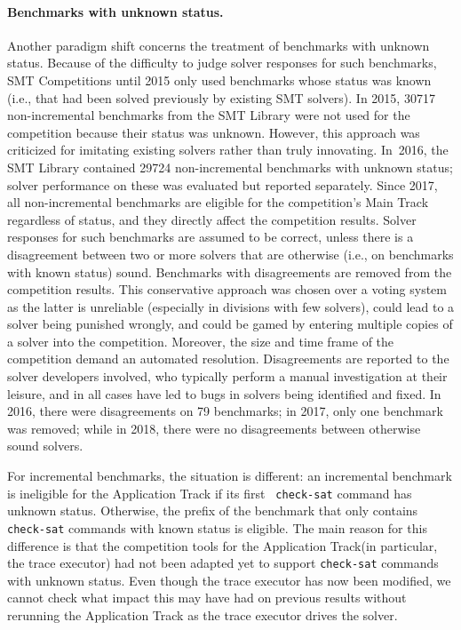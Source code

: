 \documentclass[dvipsnames,table,twoside,11pt]{article}
\newcommand{\maintrack}{Main Track\xspace}
\newcommand{\apptrack}{Application Track\xspace}
\begin{document}
\paragraph{Benchmarks with unknown status.}
Another paradigm shift concerns the treatment of benchmarks with
unknown status.  Because of the difficulty to judge solver responses
for such benchmarks, SMT Competitions until 2015 only used benchmarks
whose status was known (i.e., that had been solved previously by
existing SMT solvers).  In 2015, \num{30717} non-incremental benchmarks
from the SMT Library were not used for the competition because their
status was unknown.  However, this approach was criticized for
imitating existing solvers rather than truly innovating.  In~2016,
the SMT Library contained \num{29724} non-incremental benchmarks with
unknown status; solver performance on these was evaluated but reported
separately.  Since 2017, all non-incremental benchmarks are eligible
for the competition's \maintrack regardless of status, and they
directly affect the competition results.  Solver responses for such
benchmarks are assumed to be correct, unless there is a disagreement
between two or more solvers that are otherwise (i.e., on benchmarks with
known status) sound.  Benchmarks with disagreements are removed from
the competition results.  This conservative approach was chosen over a
voting system as the latter is unreliable (especially in divisions
with few solvers), could lead to a solver being punished wrongly, and
could be gamed by entering multiple copies of a solver into the
competition.  Moreover, the size and time frame of the competition
demand an automated resolution.  Disagreements are reported to the
solver developers involved, who typically perform a manual
investigation at their leisure, and in all cases have led to bugs in
solvers being identified and fixed.  In 2016, there were disagreements
on 79 benchmarks; in 2017, only one benchmark was removed; while in
2018, there were no disagreements between otherwise sound solvers.

For incremental benchmarks, the situation is different: an incremental
benchmark is ineligible for the \apptrack if its first {\tt
  check-sat} command has unknown status.  Otherwise, the prefix of the
benchmark that only contains {\tt check-sat} commands with known
status is eligible.  The main reason for this difference is that the
competition tools for the \apptrack (in particular, the trace
executor) had not been adapted yet to support {\tt check-sat}
commands with unknown status. Even though the trace executor has now been modified, we cannot check what impact this may have had on previous results without rerunning the \apptrack as the trace executor drives the solver.
\end{document}
